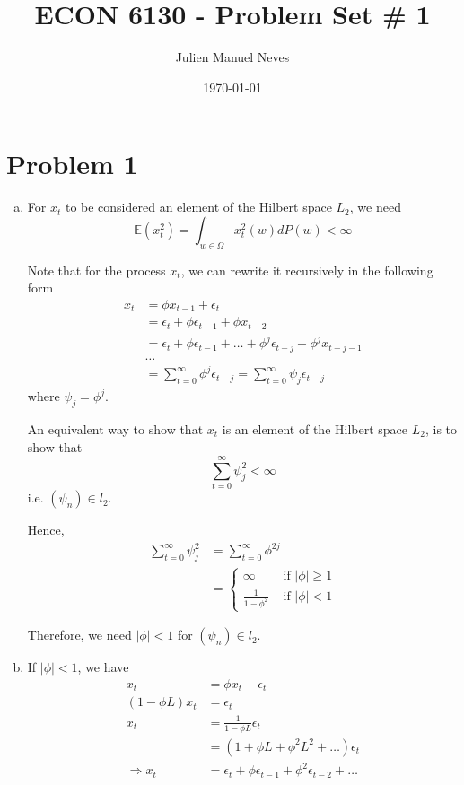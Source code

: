 \documentclass[12pt]{article}
\title{ECON 6130 - Problem Set \# 1}
\date{\today}
\author{Julien Manuel Neves}
\theoremstyle{definition}
\newcommand\E{\mathbb{E}}
\newcommand{\mat}[1]{\begin{matrix}#1\end{matrix}}
\begin{document}
\maketitle

\section*{Problem 1}
\begin{enumerate}[(a)]
	\item
	
	For $x_t$ to be considered an element of the Hilbert space $L_2$, we need
	\[
	\E(x_t^2)=\int_{w\in \Omega}x_t^2(w)dP(w)<\infty
	\]
	
	Note that for the process $x_t$, we can rewrite it recursively in the following form
	\begin{align*}
		x_t &= \phi x_{t-1}+\epsilon_t\\
		&= \epsilon_t +\phi \epsilon_{t-1}+ \phi x_{t-2}\\
		&= \epsilon_t + \phi \epsilon_{t-1}+ \dots + \phi^j \epsilon_{t-j} + \phi^j x_{t-j-1}\\
		& \dots \\
		&= \sum_{t=0}^{\infty}\phi^j\epsilon_{t-j} = \sum_{t=0}^{\infty}\psi_j \epsilon_{t-j}
	\end{align*}
	where $\psi_j = \phi^j$.
	
	An equivalent way to show that $x_t$ is an element of the Hilbert space $L_2$, is to show that
	\[
	 \sum_{t=0}^{\infty}\psi_j^2<\infty
	\]
	i.e. $(\psi_n)\in l_2$.
	
	Hence,
	\begin{align*}
\sum_{t=0}^{\infty}\psi_j^2&= \sum_{t=0}^{\infty}\phi^{2j}\\
& = \left\lbrace \mat{\infty & \text{ if }|\phi|\geq 1 \\ 
\frac{1}{1-\phi^2} & \text{ if }|\phi|< 1}\right. 
	\end{align*}
	
	Therefore, we need $|\phi|< 1$ for $(\psi_n)\in l_2$.
	\item
	
	If $|\phi|<1$, we have
	\begin{align*}
		x_t &= \phi x_t + \epsilon_t\\
		(1-\phi L)x_t &= \epsilon_t\\
		x_t &= \frac{1}{1-\phi L}\epsilon_t\\
		 &= (1+\phi L + \phi^2L^2+\dots)\epsilon_t\\
		\Rightarrow x_t &= \epsilon_t + \phi \epsilon_{t-1} + \phi^2 \epsilon_{t-2}+\dots \\
	\end{align*}
	

\end{enumerate}
\end{document}
